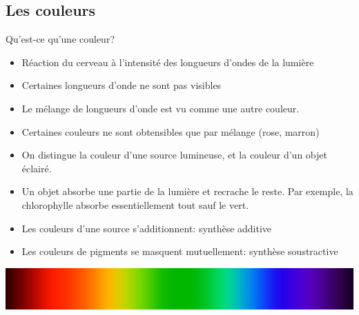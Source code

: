 \subsection{Les couleurs}
\begin{frame}{Qu'est-ce qu'une couleur?}
  \begin{itemize}
  \item Réaction du cerveau à l'intensité des longueurs d'ondes de la lumière
  \item Certaines longueurs d'onde ne sont pas visibles
  \item Le mélange de longueurs d'onde est vu comme une autre couleur.
  \item Certaines couleurs ne sont obtensibles que par mélange (rose, marron)
  \item On distingue la couleur d'une source lumineuse, et la couleur d'un
    objet éclairé.
  \item[\ddialogwarning] Un objet absorbe une partie de la lumière et recrache
    le reste. Par exemple, la chlorophylle absorbe essentiellement tout sauf
    le vert.
  \item Les couleurs d'une source s'additionnent: synthèse additive
  \item Les couleurs de pigments se masquent mutuellement: synthèse
    soustractive
  \end{itemize}
  \begin{center}
    \includegraphics[width=.8\linewidth]{img/06/Spectrum_roygbiv.jpg}
  \end{center}
\end{frame}
